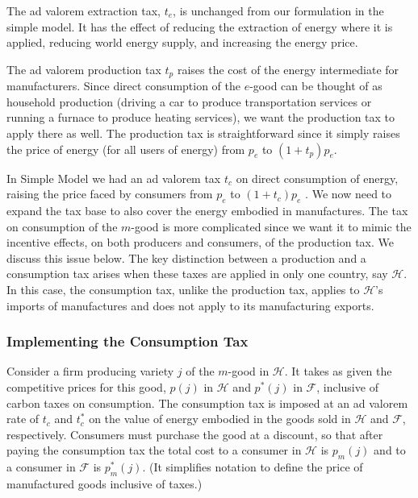 \documentclass[notitlepage,12pt]{article}
\begin{document}
The ad valorem extraction tax, $t_{e}$, is unchanged from our formulation in
the simple model. It has the effect of reducing the extraction of energy
where it is applied, reducing world energy supply, and increasing the energy
price.

The ad valorem production tax $t_{p}$ raises the cost of the energy
intermediate for manufacturers. Since direct consumption of the $e$-good can
be thought of as household production (driving a car to produce
transportation services or running a furnace to produce heating services),
we want the production tax to apply there as well. The production tax is
straightforward since it simply raises the price of energy (for all users of
energy) from $p_{e}$ to $(1+t_{p})p_{e}$.

In Simple Model we had an ad valorem tax $t_{c}$ on direct consumption of
energy, raising the price faced by consumers from $p_{e}$ to $(1+t_{c})p_{e}$%
. We now need to expand the tax base to also cover the energy embodied in
manufactures. The tax on consumption of the $m$-good is more complicated
since we want it to mimic the incentive effects, on both producers and
consumers, of the production tax. We discuss this issue below. The key
distinction between a production and a consumption tax arises when these
taxes are applied in only one country, say $\mathcal{H}$. In this case, the
consumption tax, unlike the production tax, applies to $\mathcal{H}$'s
imports of manufactures and does not apply to its manufacturing exports.

\subsubsection{Implementing the Consumption Tax}

Consider a firm producing variety $j$ of the $m$-good in $\mathcal{H}$. It
takes as given the competitive prices for this good, $p(j)$ in $\mathcal{H}$
and $p^{\ast }(j)$ in $\mathcal{F}$, inclusive of carbon taxes on
consumption. The consumption tax is imposed at an ad valorem rate of $t_{c}$
and $t_{c}^{\ast }$ on the value of energy embodied in the goods sold in $%
\mathcal{H}$ and $\mathcal{F}$, respectively. Consumers must purchase the
good at a discount, so that after paying the consumption tax the total cost
to a consumer in $\mathcal{H}$ is $p_{m}(j)$ and to a consumer in $\mathcal{F%
}$ is $p_{m}^{\ast }(j)$. (It simplifies notation to define the price of
manufactured goods inclusive of taxes.)
\end{document}
